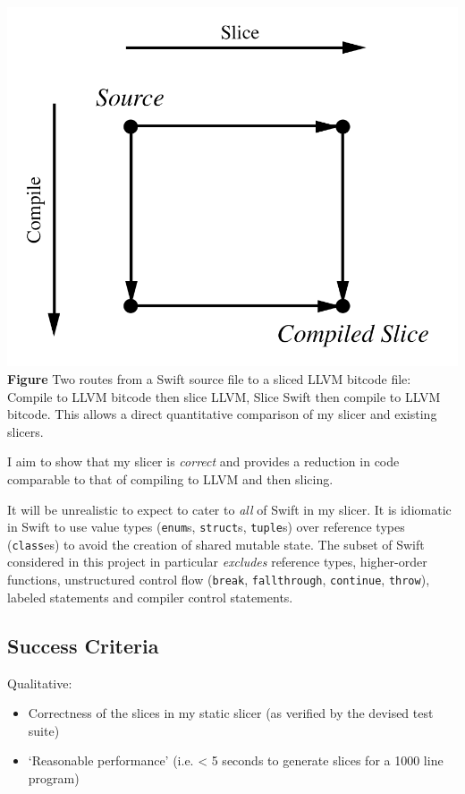 \includegraphics{SliceCompile.png} \textbf{Figure} Two routes from a
Swift source file to a sliced LLVM bitcode file: Compile to LLVM bitcode
then slice LLVM, Slice Swift then compile to LLVM bitcode. This allows a
direct quantitative comparison of my slicer and existing slicers.

I aim to show that my slicer is \emph{correct} and provides a reduction
in code comparable to that of compiling to LLVM and then slicing.

It will be unrealistic to expect to cater to \emph{all} of Swift in my
slicer. It is idiomatic in Swift to use value types (\texttt{enum}s,
\texttt{struct}s, \texttt{tuple}s) over reference types
(\texttt{class}es) to avoid the creation of shared mutable state. The
subset of Swift considered in this project in particular \emph{excludes}
reference types, higher-order functions, unstructured control flow
(\texttt{break}, \texttt{fallthrough}, \texttt{continue},
\texttt{throw}), labeled statements and compiler control statements.

\subsection{Success Criteria}\label{success-criteria}

Qualitative:

\begin{itemize}
\tightlist
\item
  Correctness of the slices in my static slicer (as verified by the
  devised test suite)
\item
  `Reasonable performance' (i.e. \textless{} 5 seconds to generate
  slices for a 1000 line program)
\end{itemize}


